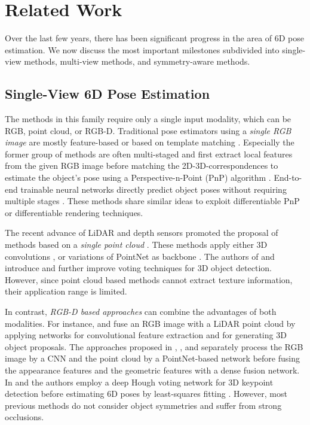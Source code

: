\section{Related Work}

Over the last few years, there has been significant progress in the area of 6D pose estimation. We now discuss the most important milestones subdivided into single-view methods, multi-view methods, and symmetry-aware methods.



\subsection{Single-View 6D Pose Estimation}

The methods in this family require only a single input modality, which can be RGB, point cloud, or RGB-D. Traditional pose estimators using a \emph{single RGB image} are mostly feature-based \cite{lowe1999sift, lowe2004distinctive, rosten2006machine, moped, collet2009object, pvnet} or based on template matching \cite{ComparingImgsTPAMI93, gu2010discriminative, 2011gradientResponseMaps, cao2016realTime6d}. Especially the former group of methods are often multi-staged and first extract local features from the given RGB image before matching the 2D-3D-correspondences to estimate the object's pose using a Perspective-n-Point (PnP) algorithm \cite{ransac}. End-to-end trainable neural networks directly predict object poses without requiring multiple stages \cite{2015viewpointsKeypoints, deepim, posecnn, gupta2019cullnet, ssd6d, tekin2018real, gdrnet, so_pose, zebrapose}. 
These methods share similar ideas to exploit differentiable PnP or differentiable rendering techniques.

The recent advance of LiDAR and depth sensors promoted the proposal of methods based on a \emph{single point cloud} \cite{chen2020survey6d, fernandes2021pointCloudSurvey}. These methods apply either 3D convolutions \cite{song2014sliding, li2017_3dFCN}, or variations of PointNet \cite{pointNet} as backbone \cite{voxelnet, second, pointpillars}. The authors of \cite{qi2019voteNet} and \cite{xie2021VENet} introduce and further improve voting techniques for 3D object detection.
However, since point cloud based methods cannot extract texture information, their application range is limited.

In contrast, \emph{RGB-D based approaches} can combine the advantages of both modalities. For instance, \cite{avod} and \cite{mv3d} fuse an RGB image with a LiDAR point cloud by applying networks for convolutional feature extraction and for generating 3D object proposals.
The approaches proposed in \cite{pointfusion}, \cite{densefusion}, and \cite{pvn3d} separately process the RGB image by a CNN and the point cloud by a PointNet-based network before fusing the appearance features and the geometric features with a dense fusion network.
In \cite{pvn3d} and \cite{ffb6d} the authors employ a deep Hough voting network for 3D keypoint detection before estimating 6D poses by least-squares fitting \cite{leastSquares}. 
However, most previous methods do not consider object symmetries and suffer from strong occlusions.




